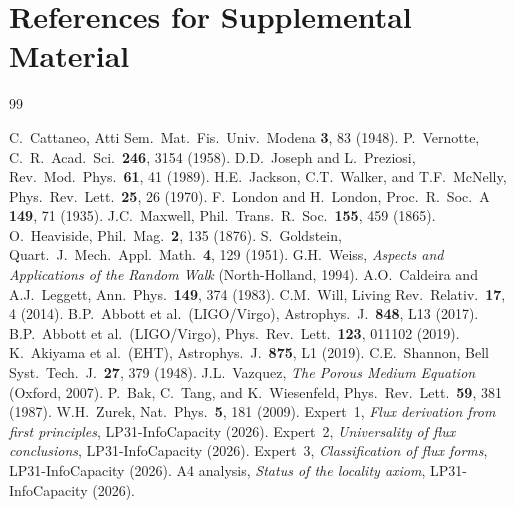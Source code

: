 \documentclass[reprint]{revtex4-2}
\begin{document}
\section*{References for Supplemental Material}

\begin{thebibliography}{99}

 C.~Cattaneo, Atti Sem.\ Mat.\ Fis.\ Univ.\ Modena \textbf{3}, 83 (1948).
 P.~Vernotte, C.\ R.\ Acad.\ Sci.\ \textbf{246}, 3154 (1958).
 D.D.\ Joseph and L.\ Preziosi, Rev.\ Mod.\ Phys.\ \textbf{61}, 41 (1989).
 H.E.\ Jackson, C.T.\ Walker, and T.F.\ McNelly, Phys.\ Rev.\ Lett.\ \textbf{25}, 26 (1970).
 F.\ London and H.\ London, Proc.\ R.\ Soc.\ A \textbf{149}, 71 (1935).
 J.C.\ Maxwell, Phil.\ Trans.\ R.\ Soc.\ \textbf{155}, 459 (1865).
 O.\ Heaviside, Phil.\ Mag.\ \textbf{2}, 135 (1876).
 S.~Goldstein, Quart.\ J.\ Mech.\ Appl.\ Math.\ \textbf{4}, 129 (1951).
 G.H.\ Weiss, \emph{Aspects and Applications of the Random Walk} (North-Holland, 1994).
 A.O.\ Caldeira and A.J.\ Leggett, Ann.\ Phys.\ \textbf{149}, 374 (1983).
 C.M.\ Will, Living Rev.\ Relativ.\ \textbf{17}, 4 (2014).
 B.P.\ Abbott et al.\ (LIGO/Virgo), Astrophys.\ J.\ \textbf{848}, L13 (2017).
 B.P.\ Abbott et al.\ (LIGO/Virgo), Phys.\ Rev.\ Lett.\ \textbf{123}, 011102 (2019).
 K.~Akiyama et al.\ (EHT), Astrophys.\ J.\ \textbf{875}, L1 (2019).
 C.E.\ Shannon, Bell Syst.\ Tech.\ J.\ \textbf{27}, 379 (1948).
 J.L.\ Vazquez, \emph{The Porous Medium Equation} (Oxford, 2007).
 P.~Bak, C.~Tang, and K.~Wiesenfeld, Phys.\ Rev.\ Lett.\ \textbf{59}, 381 (1987).
 W.H.\ Zurek, Nat.\ Phys.\ \textbf{5}, 181 (2009).
 Expert~1, \emph{Flux derivation from first principles}, LP31-InfoCapacity (2026).
 Expert~2, \emph{Universality of flux conclusions}, LP31-InfoCapacity (2026).
 Expert~3, \emph{Classification of flux forms}, LP31-InfoCapacity (2026).
 A4 analysis, \emph{Status of the locality axiom}, LP31-InfoCapacity (2026).

\end{thebibliography}
\end{document}
